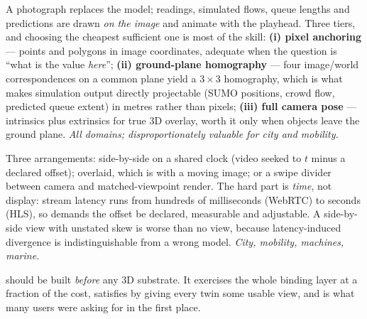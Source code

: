 \begin{description}[leftmargin=1.55cm, style=nextline, itemsep=3pt, font=\bfseries\color{dtblue}]
\item[T13 Image-substrate overlay] A photograph replaces the model; readings, simulated
flows, queue lengths and predictions are drawn \emph{on the image} and animate with the
playhead. Three tiers, and choosing the cheapest sufficient one is most of the skill:
\textbf{(i) pixel anchoring} --- points and polygons in image coordinates, adequate
when the question is ``what is the value \emph{here}''; \textbf{(ii) ground-plane
homography} --- four image/world correspondences on a common plane yield a $3\times3$
homography, which is what makes simulation output directly projectable (SUMO positions,
crowd flow, predicted queue extent) in metres rather than pixels; \textbf{(iii) full
camera pose} --- intrinsics plus extrinsics for true 3D overlay, worth it only when
objects leave the ground plane. \emph{All domains; disproportionately valuable for city
and mobility.}

\item[T14 Live video beside simulation] Three arrangements: side-by-side on a shared
clock (video seeked to $t$ minus a declared offset); overlaid, which is  with a
moving image; or a swipe divider between camera and matched-viewpoint render. The hard
part is \emph{time}, not display: stream latency runs from hundreds of milliseconds
(WebRTC) to seconds (HLS), so  demands the offset be declared, measurable and
adjustable. A side-by-side view with unstated skew is worse than no view, because
latency-induced divergence is indistinguishable from a wrong model. \emph{City,
mobility, machines, marine.}

\end{description}

\begin{keypoint}
 should be built \emph{before} any 3D substrate. It exercises the whole binding
layer at a fraction of the cost, satisfies  by giving every twin some usable
view, and is what many users were asking for in the first place.
\end{keypoint}

